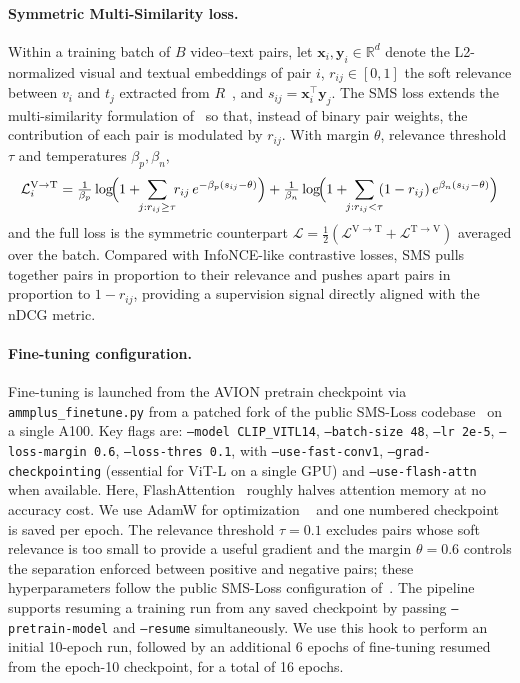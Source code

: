 \paragraph{Symmetric Multi-Similarity loss.}
Within a training batch of $B$ video--text pairs, let $\mathbf{x}_i, \mathbf{y}_i \in \mathbb{R}^d$ denote the L2-normalized visual and textual embeddings of pair $i$, $r_{ij} \in [0,1]$ the soft relevance between $v_i$ and $t_j$ extracted from $R$~\cite{wray2021semantic}, and $s_{ij} = \mathbf{x}_i^{\!\top}\mathbf{y}_j$. The SMS loss extends the multi-similarity formulation of~\cite{wang2019multisimilarity} so that, instead of binary pair weights, the contribution of each pair is modulated by $r_{ij}$. With margin $\theta$, relevance threshold $\tau$ and temperatures $\beta_p, \beta_n$,
\begin{dmath}
\mathcal{L}^{\mathrm{V\to T}}_i = \tfrac{1}{\beta_p}\log\!\Bigl(1 + \!\!\sum_{j: r_{ij}\ge \tau}\!\! r_{ij}\,e^{-\beta_p(s_{ij}-\theta)}\Bigr) + \tfrac{1}{\beta_n}\log\!\Bigl(1 + \!\!\sum_{j: r_{ij}<\tau}\!\! (1-r_{ij})\,e^{\beta_n(s_{ij}-\theta)}\Bigr)
\label{eq:sms}
\end{dmath}
and the full loss is the symmetric counterpart $\mathcal{L} = \tfrac{1}{2}(\mathcal{L}^{\mathrm{V\to T}} + \mathcal{L}^{\mathrm{T\to V}})$ averaged over the batch. Compared with InfoNCE-like contrastive losses, SMS pulls together pairs in proportion to their relevance and pushes apart pairs in proportion to $1 - r_{ij}$, providing a supervision signal directly aligned with the nDCG metric.

\paragraph{Fine-tuning configuration.}
Fine-tuning is launched from the AVION pretrain checkpoint via \texttt{ammplus\_finetune.py} from a patched fork of the public SMS-Loss codebase~\cite{wang2024smsloss_repo} on a single A100. Key flags are: \texttt{--model CLIP\_VITL14}, \texttt{--batch-size 48}, \texttt{--lr 2e-5}, \texttt{--loss-margin 0.6}, \texttt{--loss-thres 0.1}, with \texttt{--use-fast-conv1}, \texttt{--grad-checkpointing} (essential for ViT-L on a single GPU) and \texttt{--use-flash-attn} when available. Here, FlashAttention~\cite{dao2022flashattention} roughly halves attention memory at no accuracy cost. We use AdamW for optimization ~\cite{loshchilov2019adamw} and one numbered checkpoint is saved per epoch. The relevance threshold $\tau = 0.1$ excludes pairs whose soft relevance is too small to provide a useful gradient and the margin $\theta = 0.6$ controls the separation enforced between positive and negative pairs; these hyperparameters follow the public SMS-Loss configuration of~\cite{wang2024symmetricmultisimilaritylossepickitchens100}. The pipeline supports resuming a training run from any saved checkpoint by passing \texttt{--pretrain-model} and \texttt{--resume} simultaneously. We use this hook to perform an initial 10-epoch run, followed by an additional 6 epochs of fine-tuning resumed from the epoch-10 checkpoint, for a total of 16 epochs.

